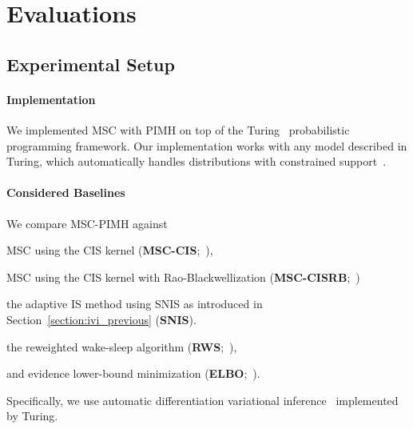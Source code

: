 \section{Evaluations}\label{section:eval}
\subsection{Experimental Setup}
\paragraph{Implementation}
We implemented MSC with PIMH on top of the Turing~\citep{ge2018t} probabilistic programming framework.
Our implementation works with any model described in Turing, which automatically handles distributions with constrained support~\citep{JMLR:v18:16-107}.

\paragraph{Considered Baselines}
We compare MSC-PIMH against
\begin{enumerate*}[label=\textbf{(\roman*)}]
  \item  MSC using the CIS kernel (\textbf{MSC-CIS};~\citealt{NEURIPS2020_b2070693}), 
  \item  MSC using the CIS kernel with Rao-Blackwellization (\textbf{MSC-CISRB};~\citealt{NEURIPS2020_b2070693})
  \item the adaptive IS method using SNIS as introduced in Section~\ref{section:ivi_previous} (\textbf{SNIS}).
  \item the reweighted wake-sleep algorithm (\textbf{RWS};~\citealt{DBLP:journals/corr/BornscheinB14}),  
  \item and evidence lower-bound minimization (\textbf{ELBO};~\citealt{pmlr-v33-ranganath14}).
\end{enumerate*}
Specifically, we use automatic differentiation variational inference~\citep{JMLR:v18:16-107} implemented by Turing.

